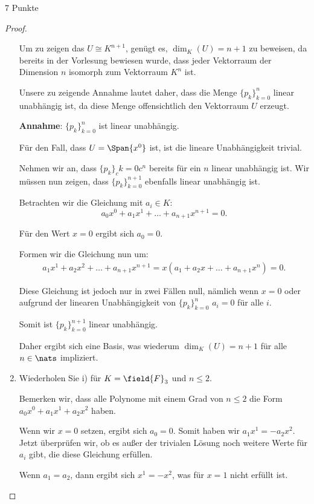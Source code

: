 \documentclass{../problemset}
\begin{document}
\begin{problem}{7 Punkte}
\begin{proof}
\begin{enumerate}
		      Um zu zeigen das $U \cong K^{n+1}$, genügt es, $\dim_K(U) = n + 1$ zu beweisen, da bereits in der Vorlesung bewiesen wurde, dass
		      jeder Vektorraum der Dimension $n$ isomorph zum Vektorraum $K^n$ ist.

		      Unsere zu zeigende Annahme lautet daher, dass die Menge $\{p_k\}_{k=0}^{n}$ linear unabhängig ist, da diese Menge offensichtlich
		      den Vektorraum $U$ erzeugt.

		      \textbf{Annahme}: $\{p_k\}_{k=0}^{n}$ ist linear unabhängig.

		      Für den Fall, dass $U = \Span{x^0}$ ist, ist die lineare Unabhängigkeit trivial.

		      Nehmen wir an, dass $\{p_k\}_ck=0c^{n}$ bereits für ein $n$ linear unabhängig ist. Wir müssen nun zeigen, dass
		      $\{p_k\}_{k=0}^{n+1}$ ebenfalls linear unabhängig ist.

		      Betrachten wir die Gleichung mit $a_i \in K$:
		      \[
			      a_0 x^0 + a_1 x^1 + \ldots + a_{n+1} x^{n+1} = 0.
		      \]

		      Für den Wert $x = 0$ ergibt sich $a_0 = 0$.

		      Formen wir die Gleichung nun um:
		      \begin{align}
			      a_1 x^1 + a_2 x^2 + \ldots + a_{n+1}x^{n+1} = x(a_1 + a_2 x + \ldots + a_{n+1}x^n) = 0.
		      \end{align}

		      Diese Gleichung ist jedoch nur in zwei Fällen null, nämlich wenn $x = 0$ oder aufgrund der linearen Unabhängigkeit von
		      $\{p_k\}_{k=0}^{n}$ $a_i = 0$ für alle $i$.

		      Somit ist $\{p_k\}_{k=0}^{n+1}$ linear unabhängig.

		      Daher ergibt sich eine Basis, was wiederum $\dim_K(U) = n + 1$ für alle $n \in \nats$ impliziert. \checkmark

		\item Wiederholen Sie i) für $K = \field{F}_3$ und $n \leq 2$.

		      Bemerken wir, dass alle Polynome mit einem Grad von $n \leq 2$ die Form $a_0x^0 + a_1x^1 + a_2x^2$ haben.

		      Wenn wir $x = 0$ setzen, ergibt sich $a_0 = 0$. Somit haben wir $a_1x^1 = - a_2x^2$. Jetzt überprüfen wir, ob es außer der
		      trivialen Lösung noch weitere Werte für $a_i$ gibt, die diese Gleichung erfüllen.

		      Wenn $a_1 = a_2$, dann ergibt sich $x^1 = - x^2$, was für $x = 1$ nicht erfüllt ist.


\end{enumerate}
\end{proof}
\end{problem}
\end{document}
